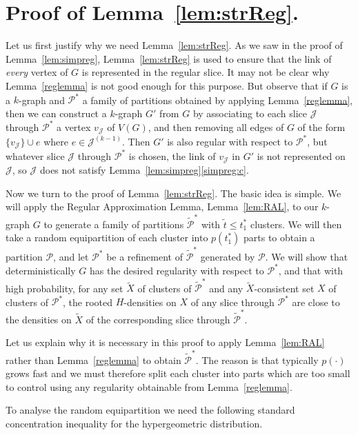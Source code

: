 \documentclass[12pt,a4paper]{amsart}
\newcommand{\cJ}{\mathcal{J}}
\newcommand{\Part}{\mathcal{P}}
\begin{document}
\section{Proof of Lemma~\ref{lem:strReg}.}
\label{app:strReg}

Let us first justify why we need Lemma~\ref{lem:strReg}.  As we saw in the
proof of Lemma~\ref{lem:simpreg}, Lemma~\ref{lem:strReg} is used to ensure
that the link of \emph{every} vertex of $G$ is represented in the regular
slice. It may not be clear why Lemma~\ref{reglemma} is not good enough for
this purpose. But observe that if $G$ is a $k$-graph and $\Part^*$ a family
of partitions obtained by applying Lemma~\ref{reglemma}, then we can
construct a $k$-graph $G'$ from $G$ by associating to each slice $\cJ$
through $\Part^*$ a vertex $v_{\cJ}$ of $V(G)$, and then removing all edges
of $G$ of the form $\{v_{\cJ}\}\cup e$ where $e\in\cJ^{(k-1)}$. Then $G'$
is also regular with respect to $\Part^*$, but whatever slice $\cJ$ through
$\Part^*$ is chosen, the link of $v_{\cJ}$ in $G'$ is not represented on
$\cJ$, so $\cJ$ does not satisfy Lemma~\ref{lem:simpreg}\ref{simpreg:c}.

\medskip

Now we turn to the proof of Lemma~\ref{lem:strReg}.  The basic idea is simple. We will apply the
Regular Approximation Lemma, Lemma~\ref{lem:RAL}, to our $k$-graph $G$ to
generate a family of partitions $\tilde{\Part}^*$ with $\tilde{t}\le t_1^*$
clusters. We will then take a random equipartition of each cluster into
$p(t_1^*)$ parts to obtain a partition $\Part$, and let $\Part^*$ be a
refinement of $\tilde{\Part}^*$ generated by $\Part$. We will show that
deterministically $G$ has the desired regularity with respect to
$\Part^*$, and that with high probability, for any set $\tilde{X}$ of clusters of $\tilde{\Part}^*$ and any $\tilde{X}$-consistent set $X$ of clusters of $\Part^*$, the  
rooted $H$-densities on $X$ of any slice through $\Part^*$ are close to the densities on $\tilde{X}$ of the corresponding slice through $\tilde{\Part}^*$. 

Let us explain why it is necessary in this proof to apply
Lemma~\ref{lem:RAL} rather than Lemma~\ref{reglemma} to obtain
$\tilde{\Part}^*$. The reason is that typically $p(\cdot)$ grows fast and
we must therefore split each cluster into parts which are too small to
control using any regularity obtainable from Lemma~\ref{reglemma}. 

To analyse the random equipartition we need the following
standard concentration inequality for the hypergeometric distribution.
\end{document}
